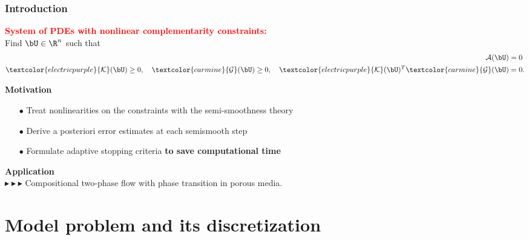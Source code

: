 \documentclass[10 pt]{beamer}
\begin{document}
\begin{frame}[t]
\frametitle{Introduction}
\textcolor{red}{\textbf{System of PDEs with nonlinear complementarity constraints:}}
\\Find $\bU \in \R^n$ such that
\begin{equation*}
\begin{split}
\mathcal{A}(\bU)& {}= 0\\
\textcolor{electricpurple}{\mathcal{K}}(\bU) \geq 0, \quad \textcolor{carmine}{\mathcal{G}}(\bU) \geq 0, \quad \textcolor{electricpurple}{\mathcal{K}}(\bU)^{T} \textcolor{carmine}{\mathcal{G}}(\bU) &= 0.
\end{split}
\end{equation*}

\textcolor{cadmiumgreen}{\textbf{Motivation}}
\begin{itemize}
\item[$\bullet$]Treat nonlinearities on the constraints with the semi-smoothness theory \\
\item[$\bullet$] Derive a posteriori error estimates at each semismooth step \\
\item[$\bullet$] Formulate adaptive stopping criteria \textbf{to save computational time}
\end{itemize}
\vspace{0.2 cm}
\textcolor{cadmiumgreen}{\textbf{Application}}\\
\vspace{0.2 cm} $ \blacktriangleright  \blacktriangleright  \blacktriangleright$ Compositional two-phase flow with phase transition in porous media. 
\end{frame}

\section{Model problem and its discretization}
    
\subsection{}  
\end{document}

